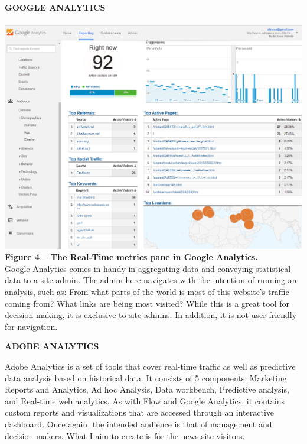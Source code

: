 \documentclass[12pt]{article}
\begin{document}
\noindent\textbf{GOOGLE ANALYTICS} \\ \\
\noindent\includegraphics[scale=0.4]{img/google_analytics} \\
\noindent\textbf{Figure 4 -- The Real-Time metrics pane in Google Analytics.} \\

Google Analytics comes in handy in aggregating data and conveying statistical data to a site admin. The admin here navigates with the intention of running an analysis, such as: From what parts of the world is most of this website's traffic coming from? What links are being most visited?
While this is a great tool for decision making, it is exclusive to site admins. In addition, it is not user-friendly for navigation. \\

\newpage

\noindent\textbf{ADOBE ANALYTICS}

Adobe Analytics is a set of tools that cover real-time traffic as well as predictive data analysis based on historical data. It consists of 5 components: Marketing Reports and Analytics, Ad hoc Analysis, Data workbench, Predictive analysis, and Real-time web analytics. As with Flow and Google Analytics, it contains custom reports and visualizations that are accessed through an interactive dashboard. Once again, the intended audience is that of management and decision makers. What I aim to create is for the news site visitors. \\
\end{document}
